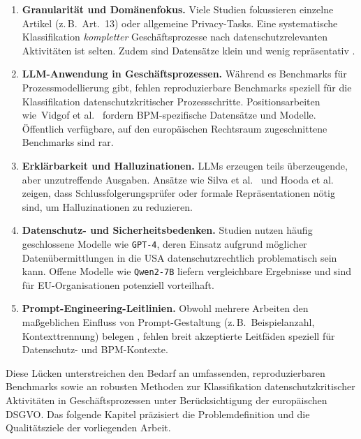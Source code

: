 \begin{enumerate}
    \item \textbf{Granularität und Domänenfokus.} Viele Studien fokussieren einzelne Artikel (z.\,B.\ Art.~13) oder allgemeine Privacy-Tasks. Eine systematische Klassifikation \emph{kompletter} Geschäftsprozesse nach datenschutzrelevanten Aktivitäten ist selten. Zudem sind Datensätze klein und wenig repräsentativ \cite{nake2023towards}.
    \item \textbf{\ac{LLM}-Anwendung in Geschäftsprozessen.} Während es Benchmarks für Prozessmodellierung gibt, fehlen reproduzierbare Benchmarks speziell für die Klassifikation datenschutzkritischer Prozessschritte. Positionsarbeiten wie\linebreak~Vidgof et al.\ \cite{vidgof2023largelanguagemodelsbusiness} fordern \ac{BPM}-spezifische Datensätze und Modelle. Öffentlich verfügbare, auf den europäischen Rechtsraum zugeschnittene Benchmarks sind rar.
    \item \textbf{Erklärbarkeit und Halluzinationen.} \acp{LLM} erzeugen teils überzeugende, aber unzutreffende Ausgaben. Ansätze wie Silva et al.\ \cite{silva2024entailment} und Hooda et al.\ \cite{hooda2024policylr} zeigen, dass Schlussfolgerungsprüfer oder formale Repräsentationen nötig sind, um Halluzinationen zu reduzieren.
    \item \textbf{Datenschutz- und Sicherheitsbedenken.} Studien nutzen häufig geschlossene Modelle wie \texttt{GPT-4}, deren Einsatz aufgrund möglicher Datenübermittlungen in die USA datenschutzrechtlich problematisch sein kann. Offene Modelle wie \texttt{Qwen2-7B} liefern vergleichbare Ergebnisse \cite{schwerin2024systematic} und sind für \ac{EU}-Organisationen potenziell vorteilhaft.
    \item \textbf{Prompt-Engineering-Leitlinien.} Obwohl mehrere Arbeiten den maßgeblichen Einfluss von Prompt-Gestaltung (z.\,B.\ Beispielanzahl, Kontexttrennung) belegen \cite{pragyan2024toward,liu2023prompting}, fehlen breit akzeptierte Leitfäden speziell für Datenschutz- und \ac{BPM}-Kontexte.
\end{enumerate}

Diese Lücken unterstreichen den Bedarf an umfassenden, reproduzierbaren Benchmarks sowie an robusten Methoden zur Klassifikation datenschutzkritischer Aktivitäten in Geschäftsprozessen unter Berücksichtigung der europäischen \ac{DSGVO}. Das folgende Kapitel präzisiert die Problemdefinition und die Qualitätsziele der vorliegenden Arbeit.
